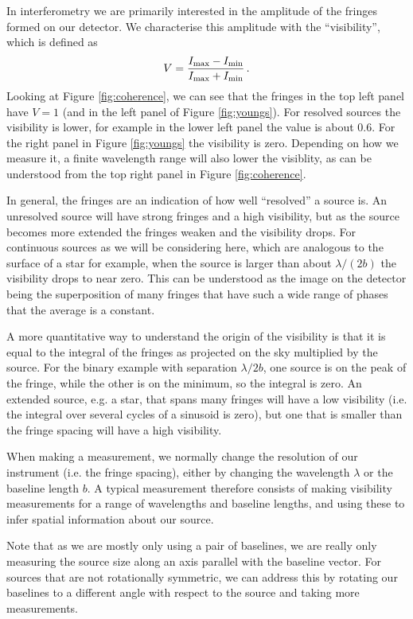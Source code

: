 \documentclass[11pt]{article}
\begin{document}
In interferometry we are primarily interested in the amplitude of the fringes formed on our detector. We characterise this amplitude with the ``visibility'', which is defined as
\begin{equation}
    V = \frac{I_{\rm max} - I_{\rm min}}{I_{\rm max} + I_{\rm min}} \, .
\end{equation}
Looking at Figure \ref{fig:coherence}, we can see that the fringes in the top left panel have $V=1$ (and in the left panel of Figure \ref{fig:youngs}). For resolved sources the visibility is lower, for example in the lower left panel the value is about 0.6. For the right panel in Figure \ref{fig:youngs} the visibility is zero. Depending on how we measure it, a finite wavelength range will also lower the visiblity, as can be understood from the top right panel in Figure \ref{fig:coherence}.

In general, the fringes are an indication of how well ``resolved'' a source is. An unresolved source will have strong fringes and a high visibility, but as the source becomes more extended the fringes weaken and the visibility drops. For continuous sources as we will be considering here, which are analogous to the surface of a star for example, when the source is larger than about $\lambda/(2b)$ the visibility drops to near zero. This can be understood as the image on the detector being the superposition of many fringes that have such a wide range of phases that the average is a constant.

A more quantitative way to understand the origin of the visibility is that it is equal to the integral of the fringes as projected on the sky multiplied by the source. For the binary example with separation $\lambda/2b$, one source is on the peak of the fringe, while the other is on the minimum, so the integral is zero. An extended source, e.g. a star, that spans many fringes will have a low visibility (i.e. the integral over several cycles of a sinusoid is zero), but one that is smaller than the fringe spacing will have a high visibility.

When making a measurement, we normally change the resolution of our instrument (i.e. the fringe spacing), either by changing the wavelength $\lambda$ or the baseline length $b$. A typical measurement therefore consists of making visibility measurements for a range of wavelengths and baseline lengths, and using these to infer spatial information about our source.

Note that as we are mostly only using a pair of baselines, we are really only measuring the source size along an axis parallel with the baseline vector. For sources that are not rotationally symmetric, we can address this by rotating our baselines to a different angle with respect to the source and taking more measurements.
\end{document}
